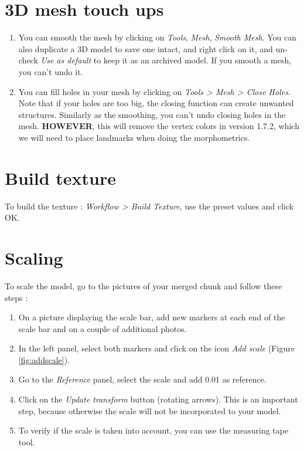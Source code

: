 \documentclass[
]{book}
\begin{document}
\hypertarget{d-mesh-touch-ups}{%
\section{3D mesh touch ups}\label{d-mesh-touch-ups}}

\begin{enumerate}
\def\labelenumi{\arabic{enumi}.}
\item
  You can smooth the mesh by clicking on \emph{Tools}, \emph{Mesh}, \emph{Smooth
  Mesh}. You can also duplicate a 3D model to save one intact, and
  right click on it, and un-check \emph{Use as default} to keep it as an
  archived model. If you smooth a mesh, you can't undo it.
\item
  You can fill holes in your mesh by clicking on \emph{Tools \textgreater{} Mesh \textgreater{}
  Close Holes}. Note that if your holes are too big, the closing
  function can create unwanted structures. Similarly as the smoothing,
  you can't undo closing holes in the mesh. \textbf{HOWEVER}, this will
  remove the vertex colors in version 1.7.2, which we will need to
  place landmarks when doing the morphometrics.
\end{enumerate}

\hypertarget{build-texture}{%
\section{Build texture}\label{build-texture}}

To build the texture : \emph{Workflow \textgreater{} Build Texture}, use the preset
values and click OK.

\hypertarget{scaling}{%
\section{Scaling}\label{scaling}}

To scale the model, go to the pictures of your merged chunk and follow
these steps :

\begin{enumerate}
\def\labelenumi{\arabic{enumi}.}
\item
  On a picture displaying the scale bar, add new markers at each end
  of the scale bar and on a couple of additional photos.
\item
  In the left panel, select both markers and click on the icon \emph{Add
  scale} (Figure \ref{fig:addscale}).
\item
  Go to the \emph{Reference} panel, select the scale and add 0.01 as
  reference.
\item
  Click on the \emph{Update transform} button (rotating arrows). This is an
  important step, because otherwise the scale will not be incorporated
  to your model.
\item
  To verify if the scale is taken into account, you can use the
  measuring tape tool.
\end{enumerate}
\end{document}
